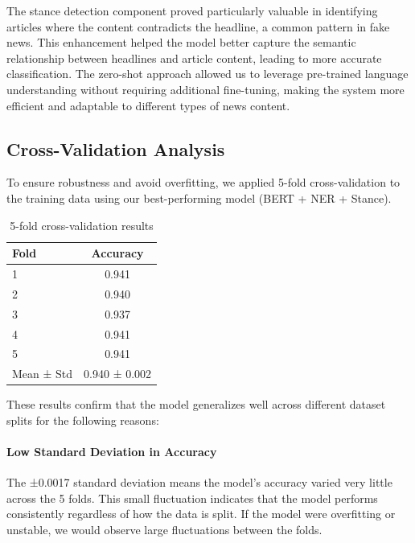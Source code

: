 \documentclass[11pt,a4paper]{article}
\begin{document}
The stance detection component proved particularly valuable in identifying articles where the content contradicts the headline, a common pattern in fake news. This enhancement helped the model better capture the semantic relationship between headlines and article content, leading to more accurate classification. The zero-shot approach allowed us to leverage pre-trained language understanding without requiring additional fine-tuning, making the system more efficient and adaptable to different types of news content.

\subsection{Cross-Validation Analysis}

To ensure robustness and avoid overfitting, we applied 5-fold cross-validation to the training data using our best-performing model (BERT + NER + Stance).

\begin{table}[h]
    \centering
    \caption{5-fold cross-validation results}
    \label{tab:cross_validation}
    \small
    \begin{tabular}{@{}lc@{}}
        \toprule
        \textbf{Fold} & \textbf{Accuracy} \\
        \midrule
        1 & 0.941 \\
        2 & 0.940 \\
        3 & 0.937 \\
        4 & 0.941 \\
        5 & 0.941 \\
        \midrule
        Mean ± Std & 0.940 ± 0.002 \\
        \bottomrule
    \end{tabular}
\end{table}

These results confirm that the model generalizes well across different dataset splits for the following reasons:

\paragraph{Low Standard Deviation in Accuracy}
The ±0.0017 standard deviation means the model's accuracy varied very little across the 5 folds. This small fluctuation indicates that the model performs consistently regardless of how the data is split. If the model were overfitting or unstable, we would observe large fluctuations between the folds.
\end{document}
